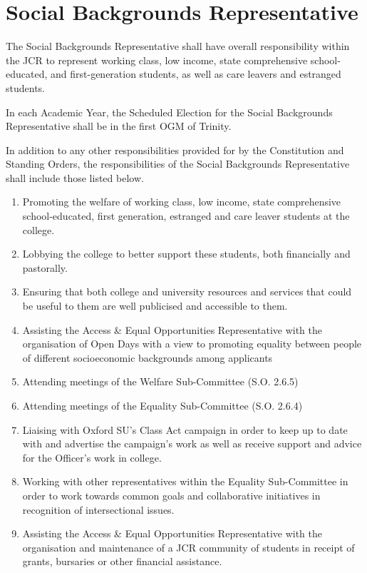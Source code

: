 \section{Social Backgrounds Representative}
\npara	The Social Backgrounds Representative shall have overall responsibility within the JCR to represent working class, low income, state comprehensive school-educated, and first-generation students, as well as care leavers and estranged students.

\npara In each Academic Year, the Scheduled Election for the Social Backgrounds Representative shall be in the first OGM of Trinity.

\npara	In addition to any other responsibilities provided for by the Constitution and Standing Orders, the responsibilities of the Social Backgrounds Representative shall include those listed below. 
\begin{enumerate}
    \item Promoting the welfare of working class, low income, state comprehensive school-educated, first generation, estranged and care leaver students at the college.
    \item Lobbying the college to better support these students, both financially and pastorally.
    \item Ensuring that both college and university resources and services that could be useful to them are well publicised and accessible to them.
    \item Assisting the Access \& Equal Opportunities Representative with the organisation of Open Days with a view to promoting equality between people of different socioeconomic backgrounds among applicants
    \item Attending meetings of the Welfare Sub-Committee (S.O. 2.6.5)
    \item Attending meetings of the Equality Sub-Committee (S.O. 2.6.4)
    \item Liaising with Oxford SU’s Class Act campaign in order to keep up to date with and advertise the campaign’s work as well as receive support and advice for the Officer’s work in college.
    \item Working with other representatives within the Equality Sub-Committee in order to work towards common goals and collaborative initiatives in recognition of intersectional issues.
    \item Assisting the Access \& Equal Opportunities Representative with the organisation and maintenance of a JCR community of students in receipt of grants, bursaries or other financial assistance.
\end{enumerate}

